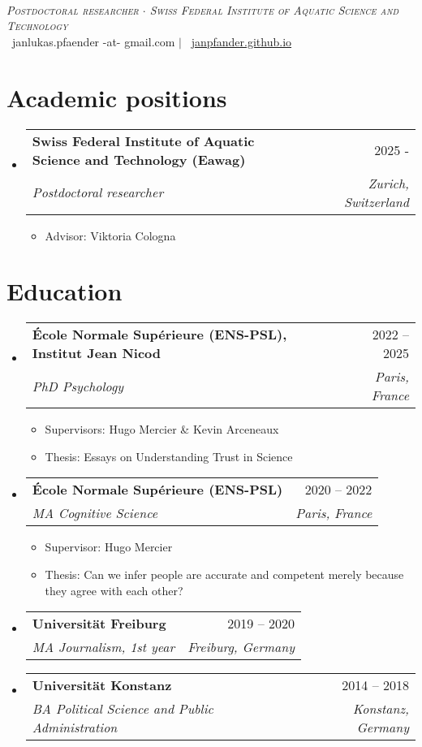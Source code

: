 \documentclass[letterpaper,11pt]{article}
\makeatletter
\newcommand{\resumeItem}[1]{
  \item\small{
    {#1 \vspace{-2pt}}
  }
}
\newcommand{\resumeSubheading}[4]{
  \vspace{1pt}\item
    \begin{tabular*}{0.97\textwidth}[t]{l@{\extracolsep{\fill}}r}
      \textbf{#1} & #2 \\
      \textit{\small#3} & \textit{\small #4} \\
    \end{tabular*}\vspace{-7pt}
}
\newcommand{\resumeSubHeadingListStart}{\begin{itemize}[leftmargin=0.15in, label={}]}
\newcommand{\resumeSubHeadingListEnd}{\end{itemize}}
\newcommand{\resumeItemListStart}{\begin{itemize}}
\newcommand{\resumeItemListEnd}{\end{itemize}\vspace{-5pt}}
\makeatother
\begin{document}

\begin{center}
     \\ \vspace{1pt}
    \textit{\scshape Postdoctoral researcher $\cdot$ Swiss Federal Institute of Aquatic Science and Technology} \\ \vspace{1pt}
    \small 
    \faEnvelope\ janlukas.pfaender -at- gmail.com $|$ 
    \faHome\ \href{https://janpfander.github.io}{janpfander.github.io} 
\end{center}

\section{Academic positions}
  \resumeSubHeadingListStart
    \resumeSubheading
      {Swiss Federal Institute of Aquatic Science and Technology (Eawag)}{2025 -}
      {Postdoctoral researcher}{Zurich, Switzerland}
            \resumeItemListStart
        \resumeItem{Advisor: Viktoria Cologna}
      \resumeItemListEnd
  \resumeSubHeadingListEnd


\section{Education}
  \resumeSubHeadingListStart
    \resumeSubheading
      {École Normale Supérieure (ENS-PSL), Institut Jean Nicod}{2022 -- 2025}
      {PhD Psychology}{Paris, France}
            \resumeItemListStart
        \resumeItem{Supervisors: Hugo Mercier \& Kevin Arceneaux}
        \resumeItem{Thesis: Essays on Understanding Trust in Science}
      \resumeItemListEnd
    \resumeSubheading
      {École Normale Supérieure (ENS-PSL)}{2020 -- 2022}
      {MA Cognitive Science}{Paris, France}
            \resumeItemListStart
        \resumeItem{Supervisor: Hugo Mercier}            
        \resumeItem{Thesis: Can we infer people are accurate and competent merely because they agree with each other?}
      \resumeItemListEnd
    \resumeSubheading
      {Universität Freiburg}{2019 -- 2020}
      {MA Journalism, 1st year}{Freiburg, Germany} 
    \resumeSubheading
      {Universität Konstanz}{2014 -- 2018}
      {BA Political Science and Public Administration}{Konstanz, Germany}
  \resumeSubHeadingListEnd
\end{document}
